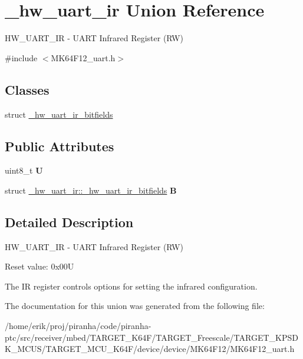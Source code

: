 \hypertarget{union__hw__uart__ir}{}\section{\+\_\+hw\+\_\+uart\+\_\+ir Union Reference}
\label{union__hw__uart__ir}


H\+W\+\_\+\+U\+A\+R\+T\+\_\+\+IR -\/ U\+A\+RT Infrared Register (RW)  




{\ttfamily \#include $<$M\+K64\+F12\+\_\+uart.\+h$>$}

\subsection*{Classes}
\begin{DoxyCompactItemize}
\item 
struct \hyperlink{struct__hw__uart__ir_1_1__hw__uart__ir__bitfields}{\+\_\+hw\+\_\+uart\+\_\+ir\+\_\+bitfields}
\end{DoxyCompactItemize}
\subsection*{Public Attributes}
\begin{DoxyCompactItemize}
\item 
uint8\+\_\+t {\bfseries U}\hypertarget{union__hw__uart__ir_ac4389c32a3aa15ff0f1d0074b69760d2}{}\label{union__hw__uart__ir_ac4389c32a3aa15ff0f1d0074b69760d2}

\item 
struct \hyperlink{struct__hw__uart__ir_1_1__hw__uart__ir__bitfields}{\+\_\+hw\+\_\+uart\+\_\+ir\+::\+\_\+hw\+\_\+uart\+\_\+ir\+\_\+bitfields} {\bfseries B}\hypertarget{union__hw__uart__ir_af51de2c25a2ed4341d375667d094e9da}{}\label{union__hw__uart__ir_af51de2c25a2ed4341d375667d094e9da}

\end{DoxyCompactItemize}


\subsection{Detailed Description}
H\+W\+\_\+\+U\+A\+R\+T\+\_\+\+IR -\/ U\+A\+RT Infrared Register (RW) 

Reset value\+: 0x00U

The IR register controls options for setting the infrared configuration. 

The documentation for this union was generated from the following file\+:\begin{DoxyCompactItemize}
\item 
/home/erik/proj/piranha/code/piranha-\/ptc/src/receiver/mbed/\+T\+A\+R\+G\+E\+T\+\_\+\+K64\+F/\+T\+A\+R\+G\+E\+T\+\_\+\+Freescale/\+T\+A\+R\+G\+E\+T\+\_\+\+K\+P\+S\+D\+K\+\_\+\+M\+C\+U\+S/\+T\+A\+R\+G\+E\+T\+\_\+\+M\+C\+U\+\_\+\+K64\+F/device/device/\+M\+K64\+F12/M\+K64\+F12\+\_\+uart.\+h\end{DoxyCompactItemize}
